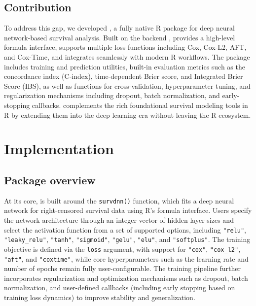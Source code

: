 \subsection{Contribution}\label{contribution}

To address this gap, we developed , a fully native R package for deep neural network-based survival analysis. Built on the  backend \citep{falbel2024torch},  provides a high-level formula interface, supports multiple loss functions including Cox, Cox-L2, AFT, and Cox-Time, and integrates seamlessly with modern R workflows. The package includes training and prediction utilities, built-in evaluation metrics such as the concordance index (C-index), time-dependent Brier score, and Integrated Brier Score (IBS), as well as functions for cross-validation, hyperparameter tuning, and regularization mechanisms including dropout, batch normalization, and early-stopping callbacks.  complements the rich foundational survival modeling tools in R by extending them into the deep learning era without leaving the R ecosystem.

\section{Implementation}\label{implementation}

\subsection{Package overview}\label{package-overview}

At its core,  is built around the \texttt{survdnn()} function, which fits a deep neural network for right-censored survival data using R's formula interface. Users specify the network architecture through an integer vector of hidden layer sizes and select the activation function from a set of supported options, including \texttt{"relu"}, \texttt{"leaky\_relu"}, \texttt{"tanh"}, \texttt{"sigmoid"}, \texttt{"gelu"}, \texttt{"elu"}, and \texttt{"softplus"}. The training objective is defined via the \texttt{loss} argument, with support for \texttt{"cox"}, \texttt{"cox\_l2"}, \texttt{"aft"}, and \texttt{"coxtime"}, while core hyperparameters such as the learning rate and number of epochs remain fully user-configurable. The training pipeline further incorporates regularization and optimization mechanisms such as dropout, batch normalization, and user-defined callbacks (including early stopping based on training loss dynamics) to improve stability and generalization.

